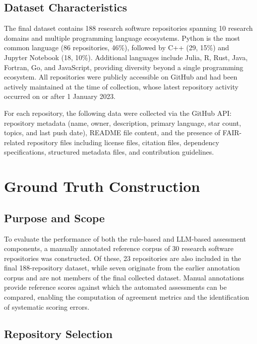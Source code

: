 \subsection{Dataset Characteristics}

The final dataset contains 188 research software repositories 
spanning 10 research domains and multiple programming language 
ecosystems. Python is the most common language (86 repositories, 
46\%), followed by C++ (29, 15\%) and Jupyter Notebook (18, 10\%). 
Additional languages include Julia, R, Rust, Java, Fortran, Go, 
and JavaScript, providing diversity beyond a single programming 
ecosystem. All repositories were publicly accessible on GitHub and 
had been actively maintained at the time of collection, whose latest 
repository activity occurred on or after 1 January 2023.

For each repository, the following data were collected via the 
GitHub API: repository metadata (name, owner, description, primary 
language, star count, topics, and last push date), README file 
content, and the presence of FAIR-related repository files including 
license files, citation files, dependency specifications, structured 
metadata files, and contribution guidelines.

\section{Ground Truth Construction}

\subsection{Purpose and Scope}

To evaluate the performance of both the rule-based and LLM-based
assessment components, a manually annotated reference corpus of
30 research software repositories was constructed. Of these,
23 repositories are also included in the final 188-repository
dataset, while seven originate from the earlier annotation corpus
and are not members of the final collected dataset. Manual
annotations provide reference scores against which the automated
assessments can be compared, enabling the computation of agreement
metrics and the identification of systematic scoring errors.

\subsection{Repository Selection}

